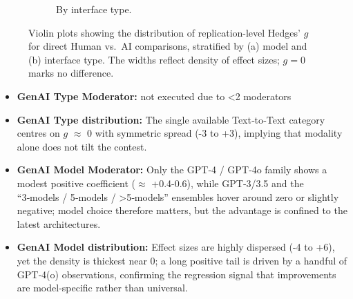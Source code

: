 \documentclass[manuscript, screen, review, acmsmall, anonymous]{acmart}
\begin{document}
\begin{figure}[h]
\begin{subfigure}[t]{0.49\linewidth}
    \caption{By interface type.}
    \label{fig:versus_raw_violin_genai_type}
  \end{subfigure}
  \caption{Violin plots showing the distribution of replication-level Hedges’ $g$ for direct Human vs.\ AI comparisons, stratified by (a) model and (b) interface type. The widths reflect density of effect sizes; $g=0$ marks no difference.}
  \label{fig:versus_raw_violins}
\end{figure}
\begin{itemize}
  \item \textbf{GenAI Type Moderator:} not executed due to <2 moderators
  \item \textbf{GenAI Type distribution:} The single available Text‑to‑Text category centres on $g$ $\approx$ 0 with symmetric spread (-3 to +3), implying that modality alone does not tilt the contest.
  \item \textbf{GenAI Model Moderator:} Only the GPT‑4 / GPT‑4o family shows a modest positive coefficient ($\approx$ +0.4-0.6), while GPT‑3/3.5 and the “3‑models / 5‑models / >5‑models” ensembles hover around zero or slightly negative; model choice therefore matters, but the advantage is confined to the latest architectures.
  \item \textbf{GenAI Model distribution:} Effect sizes are highly dispersed (-4 to +6), yet the density is thickest near 0; a long positive tail is driven by a handful of GPT‑4(o) observations, confirming the regression signal that improvements are model‑specific rather than universal.
\end{itemize}
\end{document}
